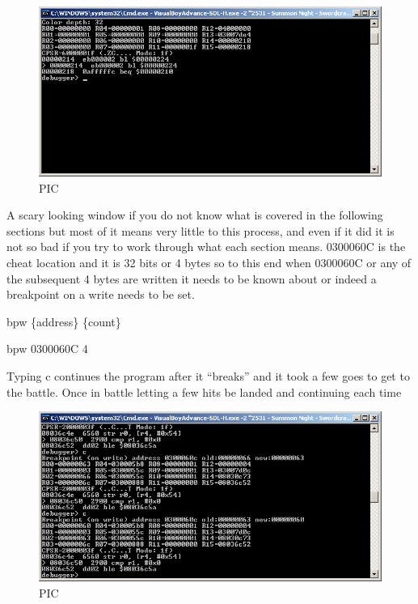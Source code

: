 \documentclass[
]{book}
\begin{document}
\begin{figure}
\centering
\includegraphics{images/211_home_fast6191_romhackingguide_unrenamed_fil___orders_romhackingguidecheatasminstruction_1.png}
\caption{PIC}
\end{figure}

A scary looking window if you do not know what is covered in the following sections but most of it means very little to this process, and even if it did it is not so bad if you try to work through what each section means. 0300060C is the cheat location and it is 32 bits or 4 bytes so to this end when 0300060C or any of the subsequent 4 bytes are written it needs to be known about or indeed a breakpoint on a write needs to be set.

bpw \{address\} \{count\}

bpw 0300060C 4

Typing c continues the program after it ``breaks'' and it took a few goes to get to the battle. Once in battle letting a few hits be landed and continuing each time

\begin{figure}
\centering
\includegraphics{images/212_home_fast6191_romhackingguide_unrenamed_fil___orders_romhackingguidecheatasminstruction_2.png}
\caption{PIC}
\end{figure}
\end{document}
